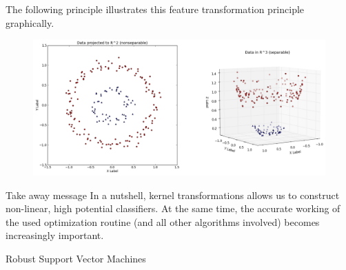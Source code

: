 \documentclass[10pt,]{beamer}
\begin{document}
\begin{frame}
The following principle illustrates this feature transformation principle graphically. 
	\begin{figure}
		\centering
		\includegraphics[width=0.9\linewidth]{twocirles}
		\label{fig:twocirles}
	\end{figure}
	
\end{frame}


\begin{frame}{Take away message}
In a nutshell, kernel transformations allows us to construct non-linear, high potential classifiers.  At the same time, the accurate working of the used optimization routine (and all other algorithms involved) becomes increasingly important.
\end{frame}

\begin{frame}{}
	\huge Robust Support Vector Machines
\end{frame}
\end{document}
